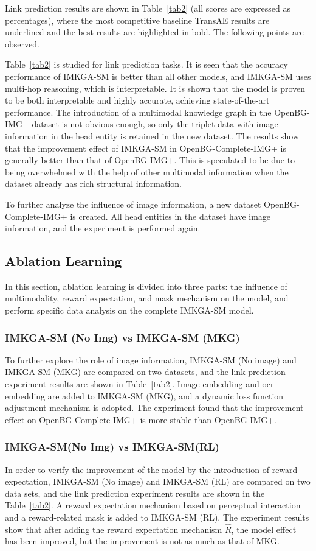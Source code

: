 \documentclass[10pt,journal,compsoc]{IEEEtran}
\begin{document}
Link prediction results are shown in Table~\ref{tab2} (all scores are expressed as percentages), where the most competitive baseline TransAE \cite{ref14} results are underlined and the best results are highlighted in bold. The following points are observed.\par
Table~\ref{tab2} is studied for link prediction tasks. It is seen that the accuracy performance of IMKGA-SM is better than all other models, and IMKGA-SM uses multi-hop reasoning, which is interpretable. It is shown that the model is proven to be both interpretable and highly accurate, achieving state-of-the-art performance. The introduction of a multimodal knowledge graph in the OpenBG-IMG+ dataset is not obvious enough, so only the triplet data with image information in the head entity is retained in the new dataset. The results show that the improvement effect of IMKGA-SM in OpenBG-Complete-IMG+ is generally better than that of OpenBG-IMG+. This is speculated to be due to being overwhelmed with the help of other multimodal information when the dataset already has rich structural information.\par
To further analyze the influence of image information, a new dataset OpenBG-Complete-IMG+ is created. All head entities in the dataset have image information, and the experiment is performed again.

\subsection{Ablation Learning}
In this section, ablation learning is divided into three parts: the influence of multimodality, reward expectation, and mask mechanism on the model, and perform specific data analysis on the complete IMKGA-SM model.
\subsubsection{IMKGA-SM (No Img) vs IMKGA-SM (MKG)} To further explore the role of image information, IMKGA-SM (No image) and IMKGA-SM (MKG) are compared on two datasets, and the link prediction experiment results are shown in Table~\ref{tab2}. Image embedding and ocr embedding are added to IMKGA-SM (MKG), and a dynamic loss function adjustment mechanism is adopted. The experiment found that the improvement effect on OpenBG-Complete-IMG+ is more stable than OpenBG-IMG+.

\subsubsection{IMKGA-SM(No Img) vs IMKGA-SM(RL)} In order to verify the improvement of the model by the introduction of reward expectation, IMKGA-SM (No image) and IMKGA-SM (RL) are compared on two data sets, and the link prediction experiment results are shown in the Table~\ref{tab2}. A reward expectation mechanism based on perceptual interaction and a reward-related mask is added to IMKGA-SM (RL). The experiment results show that after adding the reward expectation mechanism $\hat R$, the model effect has been improved, but the improvement is not as much as that of MKG.
\end{document}

